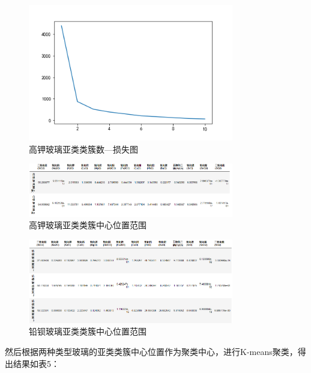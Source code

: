 \documentclass[withoutpreface,bwprint]{cumcmthesis}%
\begin{document}
	\begin{figure}[!h]
		\centering
		\includegraphics[width=0.8\textwidth]{ph9}
		\caption{高钾玻璃亚类类簇数—损失图}
		\label{fig:ph7}
	\end{figure}
    
    
    \clearpage
    \begin{figure}[!h]
    	\centering
    	\includegraphics[width=0.8\textwidth]{ph10}
    	\caption{高钾玻璃亚类类簇中心位置范围}
    	\label{fig:ph7}
    \end{figure}

	\begin{figure}[!h]
		\centering
		\includegraphics[width=0.8\textwidth]{ph11}
		\caption{铅钡玻璃亚类类簇中心位置范围}
		\label{fig:ph7}
	\end{figure}

	然后根据两种类型玻璃的亚类类簇中心位置作为聚类中心，进行K-means聚类，得出结果如表5：
	
\end{document}
